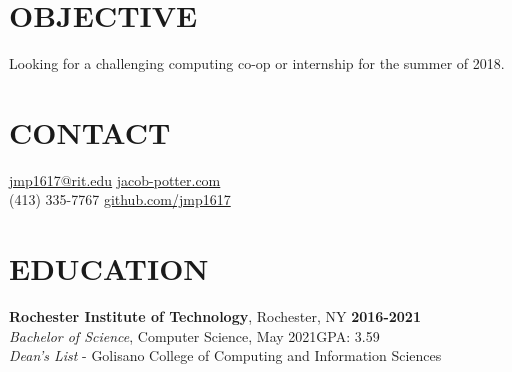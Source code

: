 \documentclass[line,margin]{res}
\begin{document}

\begin{resume}

\section{OBJECTIVE}
Looking for a challenging computing co-op or internship for the summer of 2018.

\section{CONTACT}
\href{mailto:jmp1617@rit.edu}{jmp1617@rit.edu}\hfill 
\href{https://jacob-potter.com}{jacob-potter.com}\\
(413) 335-7767\hfill 
\href{https://github.com/jmp1617}{github.com/jmp1617}

\section{EDUCATION}
\textbf{Rochester Institute of Technology}, Rochester, NY\hfill
    \textbf{2016-2021}\\
{\sl Bachelor of Science}, Computer Science, May 2021\hfill GPA: 3.59
\\
{\sl Dean's List} - Golisano College of Computing and Information Sciences


\end{resume}
\end{document}
